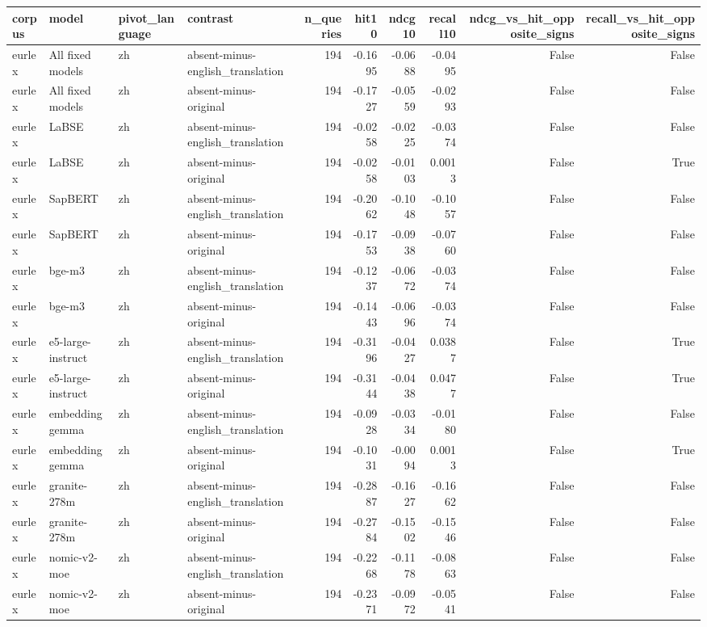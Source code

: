 \begin{tabular}{llllrrrrrr}
\toprule
corpus & model & pivot\_language & contrast & n\_queries & hit10 & ndcg10 & recall10 & ndcg\_vs\_hit\_opposite\_signs & recall\_vs\_hit\_opposite\_signs \\
\midrule
eurlex & All fixed models & zh & absent-minus-english\_translation & 194 & -0.1695 & -0.0688 & -0.0495 & False & False \\
eurlex & All fixed models & zh & absent-minus-original & 194 & -0.1727 & -0.0559 & -0.0293 & False & False \\
eurlex & LaBSE & zh & absent-minus-english\_translation & 194 & -0.0258 & -0.0225 & -0.0374 & False & False \\
eurlex & LaBSE & zh & absent-minus-original & 194 & -0.0258 & -0.0103 & 0.0013 & False & True \\
eurlex & SapBERT & zh & absent-minus-english\_translation & 194 & -0.2062 & -0.1048 & -0.1057 & False & False \\
eurlex & SapBERT & zh & absent-minus-original & 194 & -0.1753 & -0.0938 & -0.0760 & False & False \\
eurlex & bge-m3 & zh & absent-minus-english\_translation & 194 & -0.1237 & -0.0672 & -0.0374 & False & False \\
eurlex & bge-m3 & zh & absent-minus-original & 194 & -0.1443 & -0.0696 & -0.0374 & False & False \\
eurlex & e5-large-instruct & zh & absent-minus-english\_translation & 194 & -0.3196 & -0.0427 & 0.0387 & False & True \\
eurlex & e5-large-instruct & zh & absent-minus-original & 194 & -0.3144 & -0.0438 & 0.0477 & False & True \\
eurlex & embeddinggemma & zh & absent-minus-english\_translation & 194 & -0.0928 & -0.0334 & -0.0180 & False & False \\
eurlex & embeddinggemma & zh & absent-minus-original & 194 & -0.1031 & -0.0094 & 0.0013 & False & True \\
eurlex & granite-278m & zh & absent-minus-english\_translation & 194 & -0.2887 & -0.1627 & -0.1662 & False & False \\
eurlex & granite-278m & zh & absent-minus-original & 194 & -0.2784 & -0.1502 & -0.1546 & False & False \\
eurlex & nomic-v2-moe & zh & absent-minus-english\_translation & 194 & -0.2268 & -0.1178 & -0.0863 & False & False \\
eurlex & nomic-v2-moe & zh & absent-minus-original & 194 & -0.2371 & -0.0972 & -0.0541 & False & False \\

\end{tabular}
